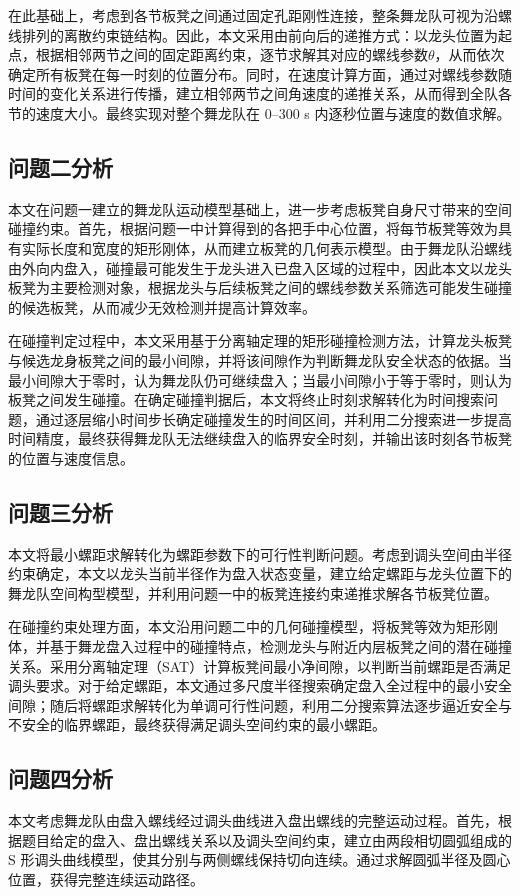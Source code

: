 \documentclass[UTF-8,a4paper,zihao=-4]{ctexart}
\begin{document}
在此基础上，考虑到各节板凳之间通过固定孔距刚性连接，整条舞龙队可视为沿螺线排列的离散约束链结构。因此，本文采用由前向后的递推方式：以龙头位置为起点，根据相邻两节之间的固定距离约束，逐节求解其对应的螺线参数$\theta$，从而依次确定所有板凳在每一时刻的位置分布。同时，在速度计算方面，通过对螺线参数随时间的变化关系进行传播，建立相邻两节之间角速度的递推关系，从而得到全队各节的速度大小。最终实现对整个舞龙队在 0–300 s 内逐秒位置与速度的数值求解。

\subsection{问题二分析}
本文在问题一建立的舞龙队运动模型基础上，进一步考虑板凳自身尺寸带来的空间碰撞约束。首先，根据问题一中计算得到的各把手中心位置，将每节板凳等效为具有实际长度和宽度的矩形刚体，从而建立板凳的几何表示模型。由于舞龙队沿螺线由外向内盘入，碰撞最可能发生于龙头进入已盘入区域的过程中，因此本文以龙头板凳为主要检测对象，根据龙头与后续板凳之间的螺线参数关系筛选可能发生碰撞的候选板凳，从而减少无效检测并提高计算效率。

在碰撞判定过程中，本文采用基于分离轴定理的矩形碰撞检测方法，计算龙头板凳与候选龙身板凳之间的最小间隙，并将该间隙作为判断舞龙队安全状态的依据。当最小间隙大于零时，认为舞龙队仍可继续盘入；当最小间隙小于等于零时，则认为板凳之间发生碰撞。在确定碰撞判据后，本文将终止时刻求解转化为时间搜索问题，通过逐层缩小时间步长确定碰撞发生的时间区间，并利用二分搜索进一步提高时间精度，最终获得舞龙队无法继续盘入的临界安全时刻，并输出该时刻各节板凳的位置与速度信息。

\subsection{问题三分析}
本文将最小螺距求解转化为螺距参数下的可行性判断问题。考虑到调头空间由半径约束确定，本文以龙头当前半径作为盘入状态变量，建立给定螺距与龙头位置下的舞龙队空间构型模型，并利用问题一中的板凳连接约束递推求解各节板凳位置。

在碰撞约束处理方面，本文沿用问题二中的几何碰撞模型，将板凳等效为矩形刚体，并基于舞龙盘入过程中的碰撞特点，检测龙头与附近内层板凳之间的潜在碰撞关系。采用分离轴定理（SAT）计算板凳间最小净间隙，以判断当前螺距是否满足调头要求。对于给定螺距，本文通过多尺度半径搜索确定盘入全过程中的最小安全间隙；随后将螺距求解转化为单调可行性问题，利用二分搜索算法逐步逼近安全与不安全的临界螺距，最终获得满足调头空间约束的最小螺距。

\subsection{问题四分析}
本文考虑舞龙队由盘入螺线经过调头曲线进入盘出螺线的完整运动过程。首先，根据题目给定的盘入、盘出螺线关系以及调头空间约束，建立由两段相切圆弧组成的 S 形调头曲线模型，使其分别与两侧螺线保持切向连续。通过求解圆弧半径及圆心位置，获得完整连续运动路径。
\end{document}
